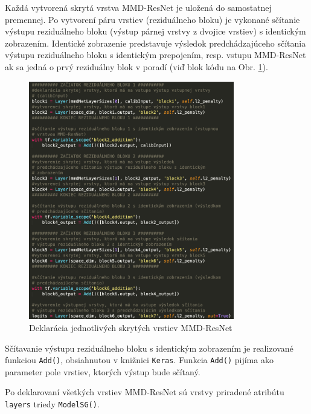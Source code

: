 Každá vytvorená skrytá vrstva MMD-ResNet je uložená do samostatnej premennej. Po vytvorení páru vrstiev (reziduálneho bloku) je vykonané sčítanie výstupu reziduálneho bloku (výstup párnej vrstvy z dvojice vrstiev) s identickým zobrazením. Identické zobrazenie predstavuje výsledok predchádzajúceho sčítania výstupu reziduálneho bloku s identickým prepojením, resp. vstupu MMD-ResNet ak sa jedná o prvý reziduálny blok v poradí (viď blok kódu na Obr. \ref{kod_vrstvy}). 

\begin{figure}
\centerline{\includegraphics[width=0.8\textwidth]{images/kod.png}}
\caption[Deklarácia skrytých vrstiev MMD-ResNet]{Deklarácia jednotlivých skrytých vrstiev MMD-ResNet}
\label{kod_vrstvy}
\end{figure}

Sčítavanie výstupu reziduálneho bloku s identickým zobrazením je realizované funkciou \texttt{Add()}, obsiahnutou v knižnici \texttt{Keras}. Funkcia \texttt{Add()} pijíma ako parameter pole vrstiev, ktorých výstup bude sčítaný.

Po deklarovaní všetkých vrstiev MMD-ResNet sú vrstvy priradené atribútu \texttt{layers} triedy \texttt{ModelSG()}.


